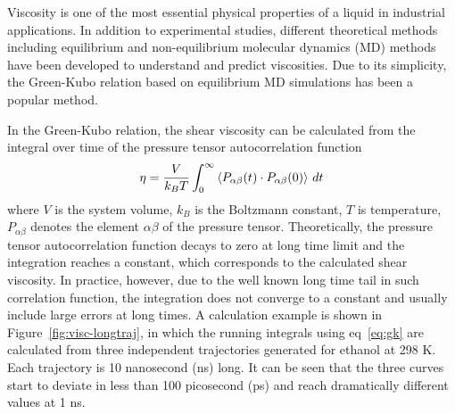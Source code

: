 \documentclass[12pt]{article}
\begin{document}
Viscosity is one of the most essential physical properties of a liquid in industrial applications.
In addition to experimental studies, 
\cite{Maginn.JPCL.1.3494.2010,	%
Atilhan.IECR.52.16774.2013,	%
Blahusiak.JCT.72.54.2014,	%
Dutt.JPCB.118.13244.2014,	%
Garrett.JPC.Lett.5.1541.2014}	%
different theoretical methods including equilibrium and non-equilibrium molecular dynamics (MD) methods
have been developed to understand and predict viscosities.
\cite{
Cummings.IECR.31.1237.1992,	%
Margulis.ACR.40.1097.2007,	%
Mu.JML.193.262.2014,		%
Hummer.JPCB.108.15873.2004,	%
Margulis.JPCB.111.4705.2007,	%
Maginn.JPCB.111.4867.2007,	%
Borodin.JPCB.113.4771.2009,	%
Mejia.JML.186.106.2013,		%
Atilhan.IECR.52.16774.2013,	%
Llovell.JPCB.117.8159.2013,	%
Lee.JPCB.118.2712.2014,		%
Yethiraj.JPCL.5.2670.2014	%
}
Due to its simplicity, 
the Green-Kubo relation based on equilibrium MD simulations has been a popular method.

In the Green-Kubo relation,
the shear viscosity can be calculated from the integral over time of the pressure tensor autocorrelation function 
\cite{ComputerSimulationOfLiquids}
\begin{equation}
{\eta = {V \over k_B T } \int_0 ^{\infty}{\langle P_{\alpha\beta}(t) \cdot P_{\alpha\beta}(0) \rangle \ dt} }
\label{eq:gk}
\end{equation}
where $V$ is the system volume,
$k_B$ is the Boltzmann constant,
$T$ is temperature,
$P_{\alpha\beta}$ denotes the element $\alpha\beta$ of the pressure tensor.
Theoretically,
the pressure tensor autocorrelation function decays to zero at long time limit
and the integration reaches a constant,
which corresponds to the calculated shear viscosity.
In practice, however, 
due to the well known long time tail in such correlation function,
\cite{Verlet.PRA.7.1690.1973}
the integration does not converge to a constant and usually include large errors at long times.
A calculation example is shown in Figure~\ref{fig:visc-longtraj},
in which the running integrals using eq~\ref{eq:gk} are calculated from three independent trajectories generated for ethanol at 298 K. 
Each trajectory is 10 nanosecond (ns) long.
It can be seen that the three curves start to deviate in less than 100 picosecond (ps)
and reach dramatically different values at 1 ns.
\end{document}
